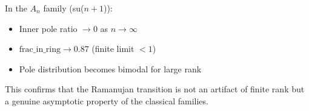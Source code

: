 In the $A_n$ family (su($n+1$)):
\begin{itemize}
    \item Inner pole ratio $\to 0$ as $n \to \infty$
    \item $\mathrm{frac\_in\_ring} \to 0.87$ (finite limit $< 1$)
    \item Pole distribution becomes bimodal for large rank
\end{itemize}

This confirms that the Ramanujan transition is not an artifact of finite rank but a genuine asymptotic property of the classical families.
